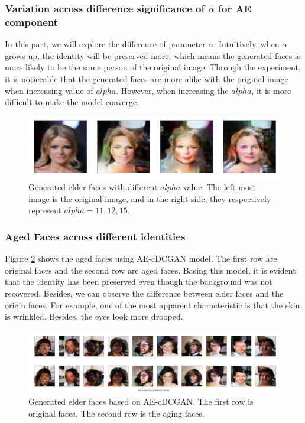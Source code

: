 \documentclass{article}
\begin{document}
\subsubsection{Variation across difference significance of $\alpha$ for AE component}
In this part, we will explore the difference of parameter $\alpha$. Intuitively, when $\alpha$ grows up, the identity will be preserved more, which means the generated faces is more likely to be the same person of the original image. Through the experiment, it is noticeable that the generated faces are more alike with the original image when increasing value of $alpha$. However, when increasing the $alpha$, it is more difficult to make the model converge.
\begin{figure}[H]
\begin{center}
  \centering
  \includegraphics[scale=0.3]{image/diff_alpha.png}
\end{center}
\caption{Generated elder faces with different $alpha$ value. The left most image is the original image, and in the right side, they respectively represent $alpha=11,12,15$.}
\label{cdcgan_loss}
\end{figure}

\subsubsection{Aged Faces across different identities}
Figure \ref{aged_AEcDCGAN} shows the aged faces using AE-cDCGAN model. The first row are original faces and the second row are aged faces. Basing this model, it is evident that the identity has been preserved even though the background was not recovered. Besides, we can observe the difference between elder faces and the origin faces. For example, one of the most apparent characteristic is that the skin is wrinkled. Besides, the eyes look more drooped.
\begin{figure}[H]
\begin{center}
  \centering
  \includegraphics[width=5.5in]{image/identity.jpg}
\end{center}
\caption{Generated elder faces based on AE-cDCGAN. The first row is original faces. The second row is the aging faces.}
\label{aged_AEcDCGAN}
\end{figure}
\end{document}
